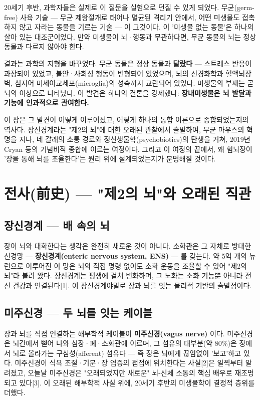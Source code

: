 \documentclass[11pt,oneside]{book}
\begin{document}
20세기 후반, 과학자들은 실제로 이 질문을 실험으로 던질 수 있게 되었다. 무균(germ-free) 사육 기술 — 무균 제왕절개로 태어나 멸균된 격리기 안에서, 어떤 미생물도 접촉하지 않고 자라는 동물을 기르는 기술 — 이 그것이다. 이 '미생물 없는 동물'은 하나의 살아 있는 대조군이었다. 만약 미생물이 뇌·행동과 무관하다면, 무균 동물의 뇌는 정상 동물과 다르지 않아야 한다.

결과는 과학의 지형을 바꾸었다. 무균 동물은 정상 동물과 \textbf{달랐다} — 스트레스 반응이 과장되어 있었고, 불안·사회성 행동이 변형되어 있었으며, 뇌의 신경화학과 혈액뇌장벽, 심지어 미세아교세포(microglia)의 성숙까지 교란되어 있었다. 미생물의 부재는 곧 뇌의 이상으로 나타났다. 이 발견은 하나의 결론을 강제했다: \textbf{장내미생물은 뇌 발달과 기능에 인과적으로 관여한다.}

이 장은 그 발견이 어떻게 이루어졌고, 어떻게 하나의 통합 이론으로 종합되었는지의 역사다. 장신경계라는 "제2의 뇌"에 대한 오래된 관찰에서 출발하여, 무균 마우스의 혁명을 지나, 네 갈래의 소통 경로와 정신생물학(psychobiotics)의 탄생을 거쳐, 2019년 Cryan 등의 기념비적 종합에 이르는 여정이다. 그리고 이 여정의 끝에서, 왜 힘뇌장이 '장을 통해 뇌를 조율한다'는 원리 위에 설계되었는지가 분명해질 것이다.

\section{전사(前史) — "제2의 뇌"와 오래된 직관}
\subsection{장신경계 — 배 속의 뇌}
장이 뇌와 대화한다는 생각은 완전히 새로운 것이 아니다. 소화관은 그 자체로 방대한 신경망 — \textbf{장신경계(enteric nervous system, ENS)} — 를 갖는다. 약 5억 개의 뉴런으로 이루어진 이 망은 뇌의 직접 명령 없이도 소화 운동을 조율할 수 있어 "제2의 뇌"라 불려 왔다. 장신경계는 평생에 걸쳐 변화하며, 그 노화는 소화 기능뿐 아니라 전신 건강과 연결된다[1]. 이 장신경계야말로 장과 뇌를 잇는 물리적 기반의 출발점이다.

\subsection{미주신경 — 두 뇌를 잇는 케이블}
장과 뇌를 직접 연결하는 해부학적 케이블이 \textbf{미주신경(vagus nerve)} 이다. 미주신경은 뇌간에서 뻗어 나와 심장·폐·소화관에 이르며, 그 섬유의 대부분(약 80\%)은 장에서 뇌로 올라가는 구심성(afferent) 섬유다 — 즉 장은 뇌에게 끊임없이 '보고'하고 있다. 미주신경이 식욕 조절·기분·장 염증의 접점에 위치한다는 사실[2]은 일찍부터 알려졌고, 오늘날 미주신경은 "오래되었지만 새로운" 뇌-신체 소통의 핵심 배우로 재조명되고 있다[3]. 이 오래된 해부학적 사실 위에, 20세기 후반의 미생물학이 결정적 층위를 더했다.
\end{document}
